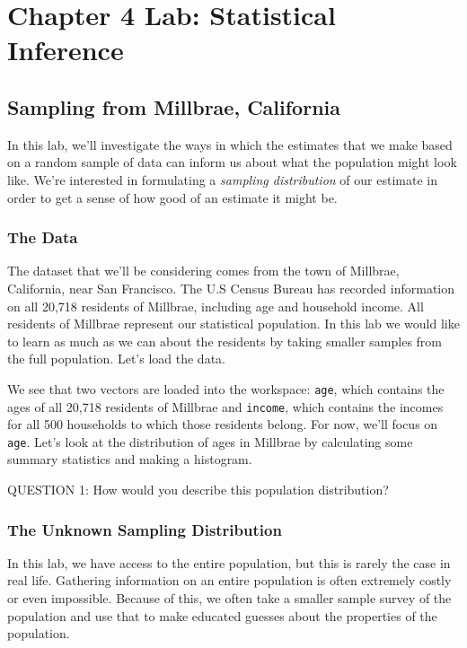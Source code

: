 \documentclass[11pt]{article}
\begin{document}
\section*{Chapter 4 Lab: Statistical Inference}
\subsection*{Sampling from Millbrae, California}

In this lab, we'll investigate the ways in which the estimates that we make based on a random sample of data can inform us about what the population might look like.  We're interested in formulating a \emph{sampling distribution} of our estimate in order to get a sense of how good of an estimate it might be.

\subsubsection*{The Data}
The dataset that we'll be considering comes from the town of Millbrae, California, near San Francisco.  The U.S Census Bureau has recorded information on all 20,718 residents of Millbrae, including age and household income.  All residents of Millbrae represent our statistical population.  In this lab we would like to learn as much as we can about the residents by taking smaller samples from the full population.  Let's load the data.


We see that two vectors are loaded into the workspace: \texttt{age}, which contains the ages of all 20,718 residents of Millbrae and \texttt{income}, which contains the incomes for all 500 households to which those residents belong.  For now, we'll focus on \texttt{age}.  Let's look at the distribution of ages in Millbrae by calculating some summary statistics and making a histogram.


QUESTION 1: How would you describe this population distribution?

\subsubsection*{The Unknown Sampling Distribution}
In this lab, we have access to the entire population, but this is rarely the case in real life.  Gathering information on an entire population is often extremely costly or even impossible.  Because of this, we often take a smaller sample survey of the population and use that to make educated guesses about the properties of the population.
\end{document}
